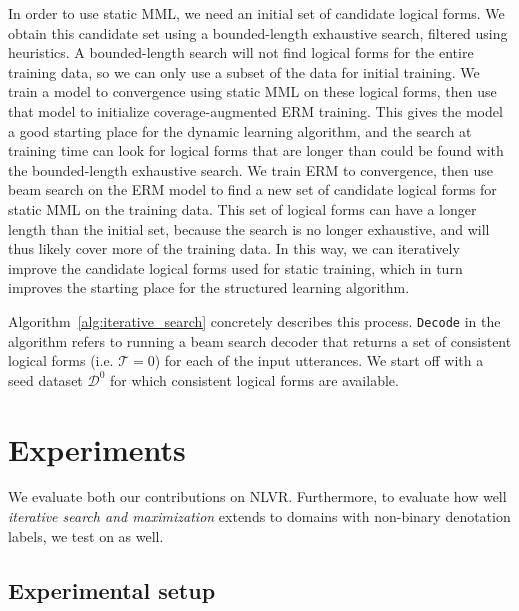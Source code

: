 In order to use static MML, we need an initial set of candidate logical forms.  We obtain this candidate set using a bounded-length exhaustive search, filtered using heuristics.  A bounded-length search will not find logical forms for the entire training data, so we can only use a subset of the data for initial training.  We train a model to convergence using static MML on these logical forms, then use that model to initialize coverage-augmented ERM training.  This gives the model a good starting place for the dynamic learning algorithm, and the search at training time can look for logical forms that are longer than could be found with the bounded-length exhaustive search.  We train ERM to convergence, then use beam search on the ERM model to find a new set of candidate logical forms for static MML on the training data.  This set of logical forms can have a longer length than the initial set, because the search is no longer exhaustive, and will thus likely cover more of the training data.  In this way, we can iteratively improve the candidate logical forms used for static training, which in turn improves the starting place for the structured learning algorithm.

Algorithm~\ref{alg:iterative_search} concretely describes this process. \texttt{Decode} in the algorithm refers to running a beam search decoder that returns a set of consistent logical forms (i.e. $\mathcal{T} = 0$) for each of the input utterances. We start off with a seed dataset $\mathcal{D}^0$ for which consistent logical forms are available.

\section{Experiments} \label{sec:experiments}

We evaluate both our contributions on NLVR. Furthermore, to evaluate how well \emph{iterative search and maximization} extends to domains with non-binary denotation labels, we test on \WTQ{} as well.

\subsection{Experimental setup}
